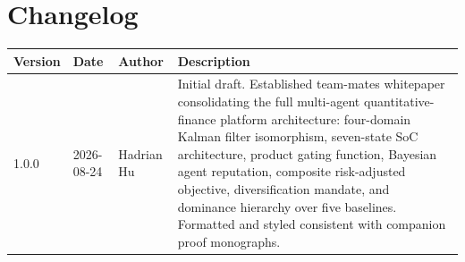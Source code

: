 \documentclass[12pt,openany]{book}
\numberwithin{equation}{chapter}
\theoremstyle{plain}
\theoremstyle{definition}
\theoremstyle{remark}
\renewcommand{\arraystretch}{1.2}
\begin{document}
\chapter*{Changelog}

\begin{center}
\renewcommand{\arraystretch}{1.35}
\begin{tabularx}{\textwidth}{@{} l l l X @{}}
\toprule
\textbf{Version} & \textbf{Date} & \textbf{Author} & \textbf{Description} \\
\midrule
1.0.0 & 2026-08-24 & Hadrian Hu
  & Initial draft.  Established team-mates whitepaper consolidating
    the full multi-agent quantitative-finance platform architecture:
    four-domain Kalman filter isomorphism, seven-state SoC
    architecture, product gating function, Bayesian agent
    reputation, composite risk-adjusted objective, diversification
    mandate, and dominance hierarchy over five baselines.
    Formatted and styled consistent with companion proof monographs.
    \\
\bottomrule
\end{tabularx}
\end{center}
\end{document}
